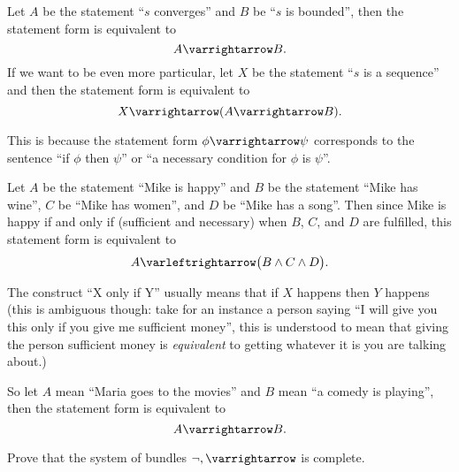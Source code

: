 \documentclass[10pt]{article}
\let\to=\varrightarrow
\let\oto=\varleftrightarrow
\begin{document}
\begin{blankpp}

    \benum
        \item Let $A$ be the statement ``$s$ converges'' and $B$ be ``$s$ is bounded'', then the statement form is equivalent to
        \[ A\to B . \]
        If we want to be even more particular, let $X$ be the statement ``$s$ is a sequence'' and then the statement form is equivalent to
        \[ X\to(A\to B) . \]

        This is because the statement form $\phi\to\psi$ corresponds to the sentence ``if $\phi$ then $\psi$'' or ``a necessary condition for $\phi$ is $\psi$''.

        \item Let $A$ be the statement ``Mike is happy'' and $B$ be the statement ``Mike has wine'', $C$ be ``Mike has women'', and $D$ be ``Mike has a song''.
        Then since Mike is happy if and only if (sufficient and necessary) when $B$, $C$, and $D$ are fulfilled, this statement form is equivalent to
        \[ A\oto\bigl(B\land C\land D\bigr) . \]

        \item The construct ``X only if Y'' usually means that if $X$ happens then $Y$ happens (this is ambiguous though: take for an instance a person saying ``I will give you this only if you give me
        sufficient money'', this is understood to mean that giving the person sufficient money is \textit{equivalent} to getting whatever it is you are talking about.)

        So let $A$ mean ``Maria goes to the movies'' and $B$ mean ``a comedy is playing'', then the statement form is equivalent to
        \[ A\to B . \]
    \eenum

\end{blankpp}

\begin{exercise*}

    Prove that the system of bundles $\neg,\to$ is complete.

\end{exercise*}
\end{document}
